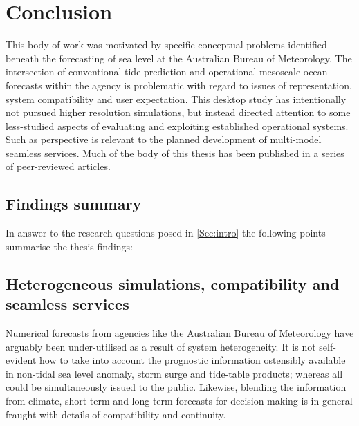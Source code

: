 
\chapter{Conclusion}\label{c:conclusions}

This body of work was motivated by specific conceptual problems identified beneath the forecasting of sea level at the Australian Bureau of Meteorology.  The intersection of conventional tide prediction and operational mesoscale ocean forecasts within the agency is problematic with regard to issues of representation, system compatibility and user expectation.
This desktop study has intentionally not pursued higher resolution simulations, but instead directed attention to some less-studied aspects of evaluating and exploiting established operational systems.   Such as perspective is relevant to the planned development of multi-model seamless services.   
Much of the body of this thesis has been published in a series of peer-reviewed articles.
\section{Findings summary}
In answer to the research questions posed in \ref{Sec:intro} the following points summarise the thesis findings:


\section{Heterogeneous simulations, compatibility and seamless services}

Numerical forecasts from agencies like the Australian Bureau of Meteorology have arguably been under-utilised as a result of system heterogeneity.   It is not self-evident how to take into account the prognostic information ostensibly available in non-tidal sea level anomaly, storm surge and tide-table products; whereas all could be simultaneously issued to the public. 
Likewise, blending the information from climate, short term and long term forecasts for decision making is in general fraught with details of compatibility and continuity.

